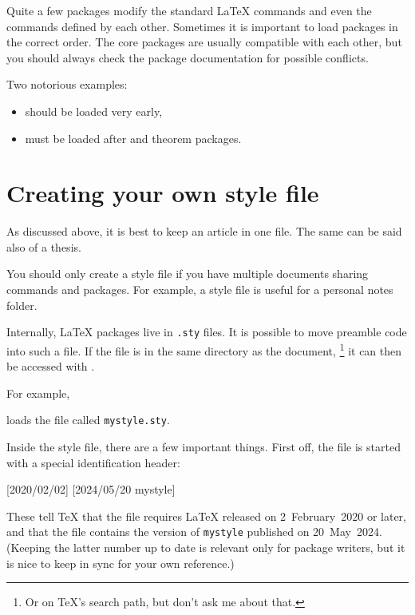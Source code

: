 \begin{gotcha}
Quite a few packages modify the standard \LaTeX{} commands
and even the commands defined by each other.
Sometimes it is important to load packages in the correct order.
The core packages are usually compatible with each other,
but you should always check the package documentation for possible conflicts.

Two notorious examples:
\begin{itemize}
\item {} should be loaded very early,
\item {} must be loaded after  and theorem packages.
\end{itemize}
\end{gotcha}



\section{Creating your own style file}

\begin{practices}
As discussed above, it is best to keep an article in one file.
The same can be said also of a thesis.

You should only create a style file if you have multiple documents sharing commands and packages.
For example, a style file is useful for a personal notes folder.
\end{practices}


Internally, \LaTeX{} packages live in \verb|.sty| files.
It is possible to move preamble code into such a file.
If the file is in the same directory as the document,%
\footnote{Or on \TeX's search path, but don't ask me about that.}
it can then be accessed with .

For example,
\begin{ExampleCode}
\usepackage{mystyle}
\end{ExampleCode}
loads the file called \verb|mystyle.sty|.


Inside the style file, there are a few important things.
First off, the file is started with a special identification header:
%
\begin{ExampleCode}
[2020/02/02]
[2024/05/20 mystyle]
\end{ExampleCode}
%
These tell \TeX{} that the file requires \LaTeX{} released on 2~February~2020 or later,
and that the file contains the version of \verb|mystyle| published on 20~May~2024.
(Keeping the latter number up to date is relevant only for package writers,
but it is nice to keep in sync for your own reference.)

